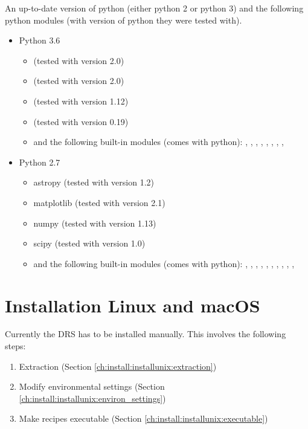 An up-to-date version of python (either python 2 or python 3) and the following python modules (with version of python they were tested with).
\begin{itemize}
\item Python 3.6
	\begin{itemize}
	\item {} (tested with version 2.0)
	\item {} (tested with version 2.0)
	\item {} (tested with version 1.12)
	\item {} (tested with version 0.19)
	\item and the following built-in modules (comes with python): 
	, , , , , , , , 
	\end{itemize}
\item Python 2.7
	\begin{itemize}
	\item astropy (tested with version 1.2)
	\item matplotlib (tested with version 2.1)
	\item numpy (tested with version 1.13)
	\item scipy (tested with version 1.0)
	\item and the following built-in modules (comes with python): , , , , , , , , , , 
	\end{itemize}
\end{itemize}



\clearpage
\newpage
\section{Installation Linux and macOS}
\label{ch:install:installunix}

Currently the DRS has to be installed manually. This involves the following steps:
\begin{enumerate}
\item Extraction (Section \ref{ch:install:installunix:extraction})
\item Modify environmental settings (Section \ref{ch:install:installunix:environ_settings})
\item Make recipes executable (Section \ref{ch:install:installunix:executable})
\end{enumerate}

